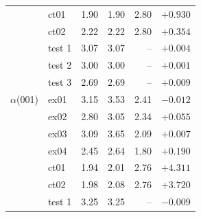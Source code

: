 \begin{table}[h]
\begin{tabular}{llrrrr}
 & ct01 & 1.90 & 1.90 & 2.80 & $+0.930$ \\
 & ct02 & 2.22 & 2.22 & 2.80 & $+0.354$ \\
 & test 1 & 3.07 & 3.07 & -- & $+0.004$ \\
 & test 2 & 3.00 & 3.00 & -- & $+0.001$ \\
 & test 3 & 2.69 & 2.69 & -- & $+0.009$ \\
$\alpha$(001) & ex01 & 3.15 & 3.53 & 2.41 & $-0.012$ \\
 & ex02 & 2.80 & 3.05 & 2.34 & $+0.055$ \\
 & ex03 & 3.09 & 3.65 & 2.09 & $+0.007$ \\
 & ex04 & 2.45 & 2.64 & 1.80 & $+0.190$ \\
 & ct01 & 1.94 & 2.01 & 2.76 & $+4.311$ \\
 & ct02 & 1.98 & 2.08 & 2.76 & $+3.720$ \\
 & test 1 & 3.25 & 3.25 & -- & $-0.009$ \\
\bottomrule
\end{tabular}
\end{table}

